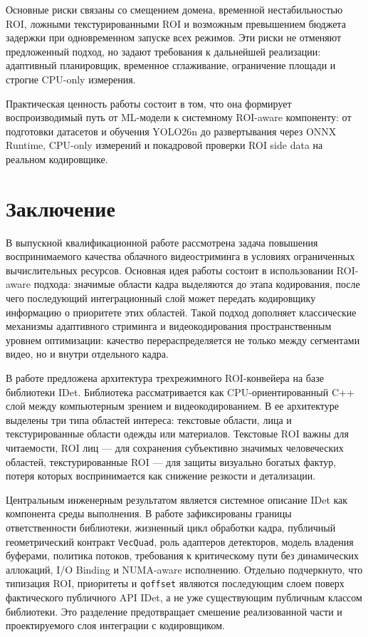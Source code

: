 \documentclass[12pt,a4paper,oneside,openany]{report}
\begin{document}
Основные риски связаны со смещением домена, временной нестабильностью ROI, ложными
текстурированными ROI и возможным превышением бюджета задержки при одновременном запуске всех
режимов. Эти риски не отменяют предложенный подход, но задают требования к дальнейшей
реализации: адаптивный планировщик, временное сглаживание, ограничение площади и строгие
CPU-only измерения.

Практическая ценность работы состоит в том, что она формирует воспроизводимый путь от ML-модели
к системному ROI-aware компоненту: от подготовки датасетов и обучения YOLO26n до развертывания
через ONNX Runtime, CPU-only измерений и покадровой проверки ROI side data на реальном
кодировщике.


\chapter*{Заключение}

В выпускной квалификационной работе рассмотрена задача повышения воспринимаемого качества
облачного видеостриминга в условиях ограниченных вычислительных ресурсов. Основная идея работы
состоит в использовании ROI-aware подхода: значимые области кадра выделяются до этапа
кодирования, после чего последующий интеграционный слой может передать кодировщику информацию о
приоритете этих областей. Такой подход дополняет классические механизмы адаптивного стриминга и
видеокодирования пространственным уровнем оптимизации: качество перераспределяется не только
между сегментами видео, но и внутри отдельного кадра.

В работе предложена архитектура трехрежимного ROI-конвейера на базе библиотеки IDet. Библиотека
рассматривается как CPU-ориентированный C++ слой между компьютерным зрением и видеокодированием.
В ее архитектуре выделены три типа областей интереса: текстовые области, лица и текстурированные
области одежды или материалов. Текстовые ROI важны для читаемости, ROI лиц --- для сохранения
субъективно значимых человеческих областей, текстурированные ROI --- для защиты визуально
богатых фактур, потеря которых воспринимается как снижение резкости и детализации.

Центральным инженерным результатом является системное описание IDet как компонента среды
выполнения. В работе зафиксированы границы ответственности библиотеки, жизненный цикл обработки
кадра, публичный геометрический контракт \texttt{VecQuad}, роль адаптеров детекторов, модель
владения буферами, политика потоков, требования к критическому пути без динамических аллокаций,
I/O Binding и NUMA-aware исполнению. Отдельно подчеркнуто, что типизация ROI, приоритеты и
\texttt{qoffset} являются последующим слоем поверх фактического публичного API IDet, а не уже
существующим публичным классом библиотеки. Это разделение предотвращает смешение реализованной
части и проектируемого слоя интеграции с кодировщиком.
\end{document}
